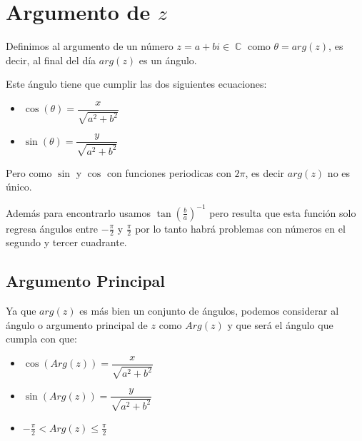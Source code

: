 \documentclass[12pt, fleqn]{report}                             %
\newcommand{\Wrap}[1]{\left( #1 \right)}                        %
\DeclareMathOperator \Complexs  {\mathbb{C}}                     %
\newcommand{\Cos}[1]{\cos\Wrap{#1}}                             %
\newcommand{\Sin}[1]{\sin\Wrap{#1}}                             %
\begin{document}
        \clearpage
        \section{Argumento de $z$}
            
            Definimos al argumento de un número $z = a+bi \in \Complexs$ como $\theta = arg(z)$,
            es decir, al final del día $arg(z)$ es un ángulo.

            Este ángulo tiene que cumplir las dos siguientes ecuaciones:

            \begin{itemize}
                \item $\Cos{\theta} = \dfrac{x}{\sqrt{a^2+b^2}}$
                \item $\Sin{\theta}   = \dfrac{y}{\sqrt{a^2+b^2}}$
            \end{itemize}

            Pero como $\sin$ y $\cos$ con funciones periodicas con $2\pi$, es decir $arg(z)$ no es único.

            Además para encontrarlo usamos $\tan(\frac{b}{a})^{-1}$ pero resulta que esta función solo
            regresa ángulos entre $-\frac{\pi}{2}$ y $\frac{\pi}{2}$ por lo tanto habrá problemas con
            números en el segundo y tercer cuadrante.

            \subsection*{Argumento Principal}

                Ya que $arg(z)$ es más bien un conjunto de ángulos, podemos considerar al ángulo o 
                argumento principal de $z$ como $Arg(z)$ y que será el ángulo que cumpla con que:

                \begin{itemize}
                    \item $\Cos{Arg(z)} = \dfrac{x}{\sqrt{a^2+b^2}}$
                    \item $\Sin{Arg(z)}   = \dfrac{y}{\sqrt{a^2+b^2}}$
                    \item $-\frac{\pi}{2} < Arg(z) \leq \frac{\pi}{2}$
                \end{itemize}
\end{document}
